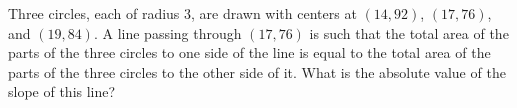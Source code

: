Three circles, each of radius 3, are drawn with centers at $(14,92)$, $(17,76)$, and $(19,84)$.  A line passing through $(17,76)$ is such that the total area of the parts of the three circles to one side of the line is equal to the total area of the parts of the three circles to the other side of it.  What is the absolute value of the slope of this line?